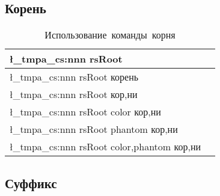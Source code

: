\subsection{Корень}

\ExplSyntaxOn{}
\begin{tcolorbox}
\end{tcolorbox}

\renewcommand{\arraystretch}{1.125}
\begin{table}[ht!]
    \centering
    \begin{tabular}{@{}ll@{}}
        \toprule
        \l_tmpa_cs:nnn { rsRoot } {} { }                     \\ \midrule
        \l_tmpa_cs:nnn { rsRoot } {} { корень }              \\ \midrule
        \l_tmpa_cs:nnn { rsRoot } {} { кор,ни }              \\ \midrule
        \l_tmpa_cs:nnn { rsRoot } {color} { кор,ни }         \\ \midrule
        \l_tmpa_cs:nnn { rsRoot } {phantom} { кор,ни }       \\ \midrule
        \l_tmpa_cs:nnn { rsRoot } {color,phantom} { кор,ни } \\ \midrule
        \bottomrule
    \end{tabular}
    \caption{Использование~команды~корня}
\end{table}

\ExplSyntaxOff{}



\subsection{Суффикс}


\ExplSyntaxOn{}
\begin{tcolorbox}
\end{tcolorbox}

